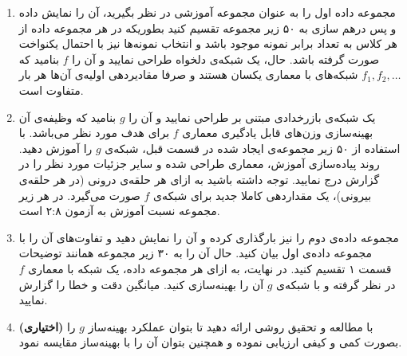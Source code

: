 \begin{enumerate}
	\item
مجموعه داده اول را به عنوان مجموعه آموزشی در نظر بگیرید، آن را نمایش داده و پس درهم سازی به ۵۰ زیر مجموعه تقسیم کنید بطوریکه در هر مجموعه داده از هر کلاس به تعداد برابر نمونه موجود باشد و انتخاب نمونه‌ها نیز با احتمال یکنواخت صورت گرفته باشد. حال، یک شبکه‌ی  دلخواه طراحی نمایید و آن را $f$ بنامید که $f_1, f_2, \ldots$ شبکه‌های  با معماری یکسان هستند و صرفا مقادیردهی اولیه‌ی آن‌ها هر بار متفاوت است.
	
	
	
	
	
	
	
	\item 
یک شبکه‌ی بازرخدادی مبتنی بر  طراحی نمایید و آن را $g$ بنامید که وظیفه‌ی آن بهینه‌سازی وزن‌های قابل یادگیری معماری $f$ برای هدف مورد نظر می‌باشد. با استفاده از ۵۰ زیر مجموعه‌ی ایجاد شده در قسمت قبل، شبکه‌ی $g$ را آموزش دهید. روند پیاده‌سازی آموزش، معماری طراحی شده و سایر جزئیات مورد نظر را در گزارش درج نمایید. توجه داشته باشید به ازای هر حلقه‌ی درونی (در هر حلقه‌ی بیرونی)، یک مقداردهی کاملا جدید برای شبکه‌ی $f$ صورت می‌گیرد. در هر زیر مجموعه نسبت آموزش به آزمون ۲:۸ است.

	\item
مجموعه داده‌ی دوم را نیز بارگذاری کرده و آن را نمایش دهید و تفاوت‌های آن را با مجموعه داده‌ی اول بیان کنید. حال آن را به ۳۰ زیر مجموعه همانند توضیحات قسمت ۱ تقسیم کنید. در نهایت، به ازای هر مجموعه داده، یک شبکه با معماری $f$ در نظر گرفته و با شبکه‌ی $g$ آن را بهینه‌سازی کنید. میانگین دقت و خطا را گزارش نمایید.




	\item
\textbf{(اختیاری)} با مطالعه و تحقیق روشی ارائه دهید تا بتوان عملکرد بهینه‌ساز $g$ را بصورت کمی و کیفی ارزیابی نموده و همچنین بتوان آن را با بهینه‌ساز  مقایسه نمود.








\end{enumerate}

















































